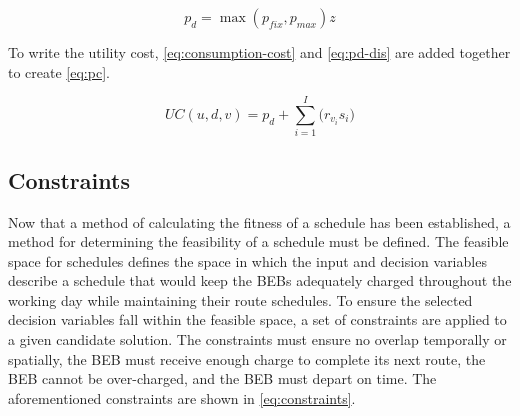 \documentclass[11pt,a4paper,final]{article}
\newcommand{\UC}{UC(u, d, v)}               %
\begin{document}
\begin{equation}
\label{eq:pd-dis}
  p_d = \max(p_{fix}, p_{max})z
\end{equation}

To write the utility cost, \ref{eq:consumption-cost} and \ref{eq:pd-dis} are added together to create \ref{eq:pc}.

\begin{equation}
\label{eq:pc}
\UC = p_d + \sum_{i=1}^I \Big( r_{v_i}s_i \Big)
\end{equation}

\subsection{Constraints}
\label{sec:constraints}
Now that a method of calculating the fitness of a schedule has been established, a method for determining the
feasibility of a schedule must be defined. The feasible space for schedules defines the space in which the input and
decision variables describe a schedule that would keep the BEBs adequately charged throughout the working day while
maintaining their route schedules. To ensure the selected decision variables fall within the feasible space, a set of
constraints are applied to a given candidate solution. The constraints must ensure no overlap temporally or spatially,
the BEB must receive enough charge to complete its next route, the BEB cannot be over-charged, and the BEB must depart
on time. The aforementioned constraints are shown in \ref{eq:constraints}.
\end{document}
